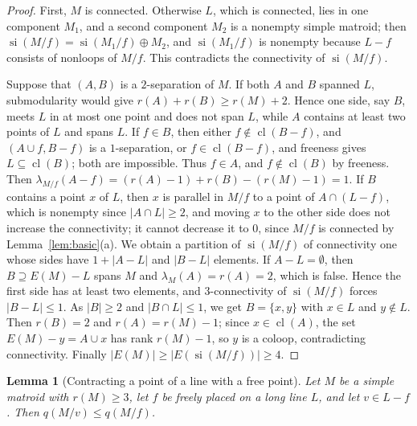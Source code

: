 \documentclass[11pt]{amsart}
\newtheorem{lemma}[theorem]{Lemma}
\theoremstyle{definition}
\theoremstyle{remark}
\numberwithin{equation}{section}
\newcommand{\cl}{\operatorname{cl}}
\newcommand{\si}{\operatorname{si}}
\newcommand{\lam}{\lambda}
\begin{document}
\begin{proof}
First, $M$ is connected. Otherwise $L$, which is connected, lies in one component $M_1$, and a second component $M_2$ is a nonempty simple matroid; then $\si(M/f)=\si(M_1/f)\oplus M_2$, and $\si(M_1/f)$ is nonempty because $L-f$ consists of nonloops of $M/f$. This contradicts the connectivity of $\si(M/f)$.

Suppose that $(A,B)$ is a $2$-separation of $M$. If both $A$ and $B$ spanned $L$, submodularity would give $r(A)+r(B)\ge r(M)+2$. Hence one side, say $B$, meets $L$ in at most one point and does not span $L$, while $A$ contains at least two points of $L$ and spans $L$. If $f\in B$, then either $f\notin\cl(B-f)$, and $(A\cup f,B-f)$ is a $1$-separation, or $f\in\cl(B-f)$, and freeness gives $L\subseteq\cl(B)$; both are impossible. Thus $f\in A$, and $f\notin\cl(B)$ by freeness. Then $\lam_{M/f}(A-f)=(r(A)-1)+r(B)-(r(M)-1)=1$. If $B$ contains a point $x$ of $L$, then $x$ is parallel in $M/f$ to a point of $A\cap(L-f)$, which is nonempty since $|A\cap L|\ge2$, and moving $x$ to the other side does not increase the connectivity; it cannot decrease it to $0$, since $M/f$ is connected by Lemma~\ref{lem:basic}(a). We obtain a partition of $\si(M/f)$ of connectivity one whose sides have $1+|A-L|$ and $|B-L|$ elements. If $A-L=\emptyset$, then $B\supseteq E(M)-L$ spans $M$ and $\lam_M(A)=r(A)=2$, which is false. Hence the first side has at least two elements, and $3$-connectivity of $\si(M/f)$ forces $|B-L|\le1$. As $|B|\ge2$ and $|B\cap L|\le1$, we get $B=\{x,y\}$ with $x\in L$ and $y\notin L$. Then $r(B)=2$ and $r(A)=r(M)-1$; since $x\in\cl(A)$, the set $E(M)-y=A\cup x$ has rank $r(M)-1$, so $y$ is a coloop, contradicting connectivity. Finally $|E(M)|\ge|E(\si(M/f))|\ge4$.
\end{proof}

\begin{lemma}[Contracting a point of a line with a free point]\label{lem:weakmap}
Let $M$ be a simple matroid with $r(M)\ge3$, let $f$ be freely placed on a long line $L$, and let $v\in L-f$. Then $q(M/v)\le q(M/f)$.
\end{lemma}
\end{document}
